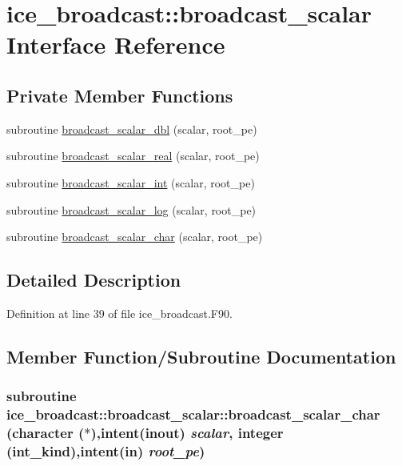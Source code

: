 \hypertarget{interfaceice__broadcast_1_1broadcast__scalar}{
\section{ice\_\-broadcast::broadcast\_\-scalar Interface Reference}
\label{interfaceice__broadcast_1_1broadcast__scalar}
}
\subsection*{Private Member Functions}
\begin{DoxyCompactItemize}
\item 
subroutine \hyperlink{interfaceice__broadcast_1_1broadcast__scalar_aa1fc5edd6a5636212a4e13e360028b3c}{broadcast\_\-scalar\_\-dbl} (scalar, root\_\-pe)
\item 
subroutine \hyperlink{interfaceice__broadcast_1_1broadcast__scalar_a0303b35ac8394e9cffec964d131f260b}{broadcast\_\-scalar\_\-real} (scalar, root\_\-pe)
\item 
subroutine \hyperlink{interfaceice__broadcast_1_1broadcast__scalar_af36f4ff2f9659bfa1adbae20aeb6e528}{broadcast\_\-scalar\_\-int} (scalar, root\_\-pe)
\item 
subroutine \hyperlink{interfaceice__broadcast_1_1broadcast__scalar_af6b1dd6f85f77f574ed68b6758065053}{broadcast\_\-scalar\_\-log} (scalar, root\_\-pe)
\item 
subroutine \hyperlink{interfaceice__broadcast_1_1broadcast__scalar_a28accef09ddb21c01868d8d92d9e2a33}{broadcast\_\-scalar\_\-char} (scalar, root\_\-pe)
\end{DoxyCompactItemize}


\subsection{Detailed Description}


Definition at line 39 of file ice\_\-broadcast.F90.

\subsection{Member Function/Subroutine Documentation}
\hypertarget{interfaceice__broadcast_1_1broadcast__scalar_a28accef09ddb21c01868d8d92d9e2a33}{
\subsubsection[{broadcast\_\-scalar\_\-char}]{\setlength{\rightskip}{0pt plus 5cm}subroutine ice\_\-broadcast::broadcast\_\-scalar::broadcast\_\-scalar\_\-char (character ($\ast$),intent(inout) {\em scalar}, \/  integer (int\_\-kind),intent(in) {\em root\_\-pe})}}
\label{interfaceice__broadcast_1_1broadcast__scalar_a28accef09ddb21c01868d8d92d9e2a33}


